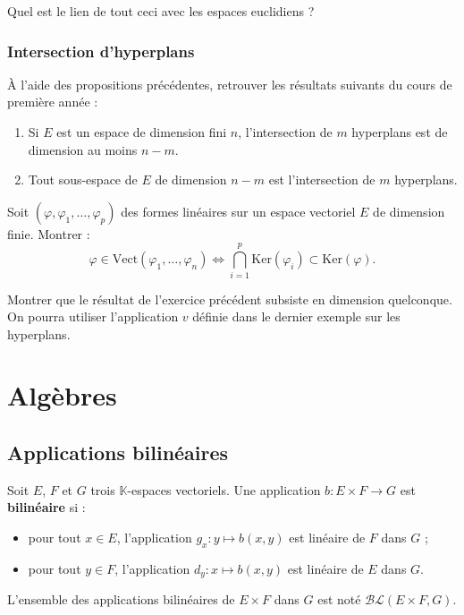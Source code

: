 \documentclass[french]{article}
\newcommand{\K}{\mathbb{K}}
\renewcommand{\ker}{\text{Ker}}
\newcommand{\Vect}{\text{Vect}}
\theoremstyle{plain}
\theoremstyle{definition}
\theoremstyle{remark}
\begin{document}
\begin{exo}
	Quel est le lien de tout ceci avec les espaces euclidiens ?
\end{exo}

\subsubsection*{Intersection d'hyperplans}

À l'aide des propositions précédentes, retrouver les résultats suivants du cours de première année :

\begin{prop}%
	\begin{enumerate}
		\item Si $E$ est un espace de dimension fini $n$, l'intersection de $m$ hyperplans est de dimension au moins $n-m$.
		\item Tout sous-espace de $E$ de dimension $n-m$ est l'intersection de $m$ hyperplans.
	\end{enumerate}
\end{prop}

\begin{exo}
	Soit $(\varphi,\varphi_1,\ldots,\varphi_p)$ des formes linéaires sur un espace vectoriel $E$ de dimension finie. Montrer : $$\varphi\in\Vect(\varphi_1,\ldots,\varphi_n)\iff\bigcap_{i=1}^p\ker(\varphi_i)\subset\ker(\varphi).$$
\end{exo}

\begin{exo}
	Montrer que le résultat de l'exercice précédent subsiste en dimension quelconque. On pourra utiliser l'application $v$ définie dans le dernier exemple sur les hyperplans.
\end{exo}

\section{Algèbres}

\subsection{Applications bilinéaires}

\begin{dfn}
	Soit $E$, $F$ et $G$ trois $\K$-espaces vectoriels. Une application $b:E\times F\to G$ est \textbf{bilinéaire} si :
	\begin{itemize}
		\item pour tout $x\in E$, l'application $g_x:y\mapsto b(x,y)$ est linéaire de $F$ dans $G$ ;
		\item pour tout $y\in F$, l'application $d_y:x\mapsto b(x,y)$ est linéaire de $E$ dans $G$.
	\end{itemize}
	L'ensemble des applications bilinéaires de $E\times F$ dans $G$ est noté $\mathcal{BL}(E\times F, G)$.
\end{dfn}
\end{document}
